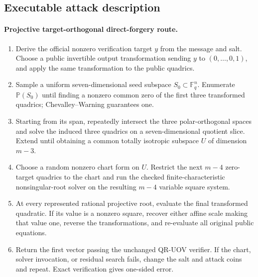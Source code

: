 \documentclass[11pt,a4paper]{article}
\theoremstyle{definition}
\theoremstyle{remark}
\newcommand{\F}{\mathbb F}
\begin{document}
\subsection{Executable attack description}

\paragraph{Projective target-orthogonal direct-forgery route.}
\begin{enumerate}
\item Derive the official nonzero verification target $y$ from the message and
salt.  Choose a public invertible output transformation sending $y$ to
$(0,\ldots,0,1)$, and apply the same transformation to the public quadrics.
\item Sample a uniform seven-dimensional seed subspace $S_0\subset\F_q^n$.
Enumerate $\mathbb P(S_0)$ until finding a nonzero common zero of the first
three transformed quadrics; Chevalley--Warning guarantees one.
\item Starting from its span, repeatedly intersect the three polar-orthogonal
spaces and solve the induced three quadrics on a seven-dimensional quotient
slice.  Extend until obtaining a common totally isotropic subspace $U$ of
dimension $m-3$.
\item Choose a random nonzero chart form on $U$.  Restrict the next $m-4$
zero-target quadrics to the chart and run the checked finite-characteristic
nonsingular-root solver on the resulting $m-4$ variable square system.
\item At every represented rational projective root, evaluate the final
transformed quadratic.  If its value is a nonzero square, recover either affine
scale making that value one, reverse the transformations, and re-evaluate all
original public equations.
\item Return the first vector passing the unchanged QR-UOV verifier.  If the
chart, solver invocation, or residual search fails, change the salt and attack
coins and repeat.  Exact verification gives one-sided error.
\end{enumerate}
\end{document}
